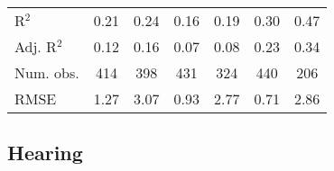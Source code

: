 \documentclass[fullpage]{paper}
\begin{document}
\begin{center}
\begin{longtable}{l c c c c c c }
\hline
R$^2$       & 0.21         & 0.24         & 0.16         & 0.19          & 0.30          & 0.47           \\
Adj. R$^2$  & 0.12         & 0.16         & 0.07         & 0.08          & 0.23          & 0.34           \\
Num. obs.   & 414          & 398          & 431          & 324           & 440           & 206            \\
RMSE        & 1.27         & 3.07         & 0.93         & 2.77          & 0.71          & 2.86           \\
\end{longtable}
\end{center}
\subsection{ Hearing }
\end{document}
